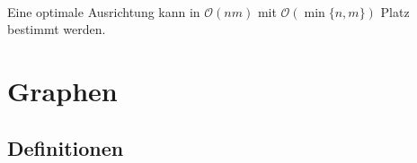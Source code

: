 \documentclass{scrartcl}
\begin{document}
 \\

Eine optimale Ausrichtung kann in $\mathcal{O}(nm)$ mit $\mathcal{O}(\min\{n,m\})$ Platz bestimmt werden.


\section{Graphen}
\subsection{Definitionen}
\end{document}
